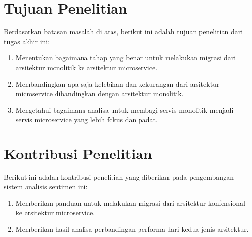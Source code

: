 \section{Tujuan Penelitian}
Berdasarkan batasan masalah di atas, berikut ini adalah tujuan penelitian dari tugas akhir ini:
\begin{enumerate}[nolistsep,leftmargin=0.5cm]
\item Menentukan bagaimana tahap yang benar untuk melakukan migrasi dari arsitektur monolitik ke arsitektur microservice.
\item Membandingkan apa saja kelebihan dan kekurangan dari arsitektur microservice dibandingkan dengan arsitektur monolitik.
\item Mengetahui bagaimana analisa untuk membagi servis monolitik menjadi servis microservice yang lebih fokus dan padat.
\end{enumerate}

\section{Kontribusi Penelitian}
Berikut ini adalah kontribusi penelitian yang diberikan pada pengembangan sistem analisis sentimen ini:
\begin{enumerate}[nolistsep,leftmargin=0.5cm]
\item Memberikan panduan untuk melakukan migrasi dari arsitektur konfensional ke arsitektur microservice.
\item Memberikan hasil analisa perbandingan performa dari kedua jenis arsitektur.
\end{enumerate}

